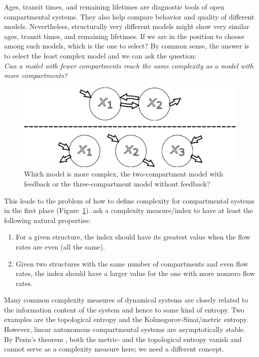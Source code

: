 \documentclass[smallextended]{svjour3}
\begin{document}
Ages, transit times, and remaining lifetimes are diagnostic tools of open compartmental systems.
They also help compare behavior and quality of different models.
Nevertheless, structurally very different models might show very similar ages, transit times, and remaining lifetimes.
If we are in the position to choose among such models, which is the one to select?
By common sense, the answer is to select the least complex model and we can ask the question:\\

\noindent\emph{Can a model with fewer compartments reach the same complexity as a model with more compartments?}\\

\begin{figure}[htbp]
    \centering
    \includegraphics[width=0.5\linewidth]{figs/which_model_more_complex.png}
    \caption{Which model is more complex, the two-compartment model with feedback or the three-compartment model without feedback?
		}
		\label{fig:which_model_more_complex}
\end{figure}

This leads to the problem of how to define complexity for compartmental systems in the first place (Figure~\ref{fig:which_model_more_complex}).
\citet[Chapter 23]{Walter1999} ask a complexity measure/index to have at least the following natural properties:
\begin{enumerate}[(1)]
 \item For a given structure, the index should have its greatest value when the flow rates are even (all the same).
 \item Given two structures with the same number of compartments and even flow rates, the index should have a larger value for the one with more nonzero flow rates.
\end{enumerate}

Many common complexity measures of dynamical systems are closely related to the information content of the system and hence to some kind of entropy.
Two examples are the topological entropy and the Kolmogorov-Sinai/metric entropy.
However, linear autonomous compartmental systems are asymptotically stable.
By Pesin's theorem \citep{Pesin1977UMN}, both the metric- and the topological entropy vanish and cannot serve as a complexity measure here; we need a different concept.
\end{document}
